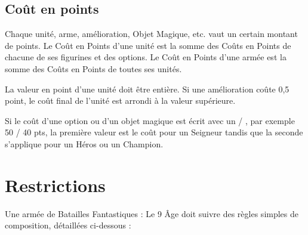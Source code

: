 \subsection{Coût en points}

Chaque unité, arme, amélioration, Objet Magique, etc. vaut un certain montant de points. Le Coût en Points d'une unité est la somme des Coûts en Points de chacune de ses figurines et des options. Le Coût en Points d'une armée est la somme des Coûts en Points de toutes ses unités.

\noindent\textbf{}

La valeur en point d'une unité doit être entière. Si une amélioration coûte 0,5 point, le coût final de l'unité est arrondi à la valeur supérieure.

\noindent\textbf{}

Si le coût d'une option ou d'un objet magique est écrit avec un \og / \fg{}, par exemple 50 / 40 pts, la première valeur est le coût pour un Seigneur tandis que la seconde s'applique pour un Héros ou un Champion.

\section{Restrictions}

Une armée de Batailles Fantastiques : Le 9\ieme{} Âge doit suivre des règles simples de composition, détaillées ci-dessous :

